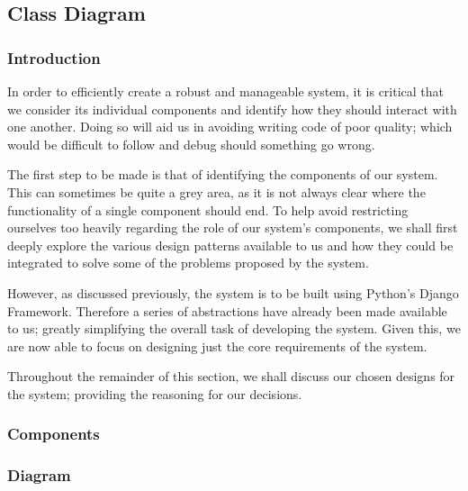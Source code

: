 \subsection{Class Diagram}
	\subsubsection{Introduction}
		In order to efficiently create a robust and manageable system, it is critical that we consider its individual components and identify how they should interact with one another. Doing so will aid us in avoiding writing code of poor quality; which would be difficult to follow and debug should something go wrong.
		
		The first step to be made is that of identifying the components of our system. This can sometimes be quite a grey area, as it is not always clear where the functionality of a single component should end. To help avoid restricting ourselves too heavily regarding the role of our system's components, we shall first deeply explore the various design patterns available to us and how they could be integrated to solve some of the problems proposed by the system.
	
		However, as discussed previously, the system is to be built using Python's Django Framework.  Therefore a series of abstractions have already been made available to us; greatly simplifying the overall task of developing the system. Given this, we are now able to focus on designing just the core requirements of the system.
		
		Throughout the remainder of this section, we shall discuss our chosen designs for the system; providing the reasoning for our decisions.
	
	\subsubsection{Components}
	
	\subsubsection{Diagram}